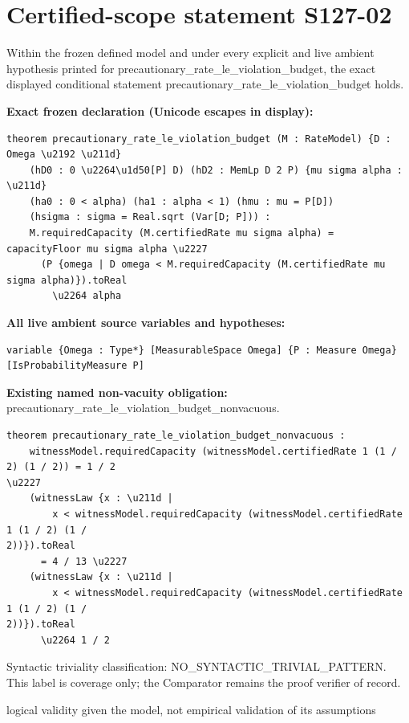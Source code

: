 \documentclass[11pt]{article}
\begin{document}
\section*{Certified-scope statement S127-02}
Within the frozen defined model and under every explicit and live ambient hypothesis printed for precautionary\_\allowbreak{}rate\_\allowbreak{}le\_\allowbreak{}violation\_\allowbreak{}budget, the exact displayed conditional statement precautionary\_\allowbreak{}rate\_\allowbreak{}le\_\allowbreak{}violation\_\allowbreak{}budget holds.
\par\noindent\textbf{Exact frozen declaration (Unicode escapes in display):}
\begin{Verbatim}[breaklines=true,breakanywhere=true,fontsize=\scriptsize]
theorem precautionary_rate_le_violation_budget (M : RateModel) {D : Omega \u2192 \u211d}
    (hD0 : 0 \u2264\u1d50[P] D) (hD2 : MemLp D 2 P) {mu sigma alpha : \u211d}
    (ha0 : 0 < alpha) (ha1 : alpha < 1) (hmu : mu = P[D])
    (hsigma : sigma = Real.sqrt (Var[D; P])) :
    M.requiredCapacity (M.certifiedRate mu sigma alpha) = capacityFloor mu sigma alpha \u2227
      (P {omega | D omega < M.requiredCapacity (M.certifiedRate mu sigma alpha)}).toReal
        \u2264 alpha
\end{Verbatim}
\noindent\textbf{All live ambient source variables and hypotheses:}
\begin{Verbatim}[breaklines=true,breakanywhere=true,fontsize=\scriptsize]
variable {Omega : Type*} [MeasurableSpace Omega] {P : Measure Omega} [IsProbabilityMeasure P]
\end{Verbatim}
\noindent\textbf{Existing named non-vacuity obligation:} precautionary\_\allowbreak{}rate\_\allowbreak{}le\_\allowbreak{}violation\_\allowbreak{}budget\_\allowbreak{}nonvacuous.
\begin{Verbatim}[breaklines=true,breakanywhere=true,fontsize=\scriptsize]
theorem precautionary_rate_le_violation_budget_nonvacuous :
    witnessModel.requiredCapacity (witnessModel.certifiedRate 1 (1 / 2) (1 / 2)) = 1 / 2
\u2227
    (witnessLaw {x : \u211d |
        x < witnessModel.requiredCapacity (witnessModel.certifiedRate 1 (1 / 2) (1 /
2))}).toReal
      = 4 / 13 \u2227
    (witnessLaw {x : \u211d |
        x < witnessModel.requiredCapacity (witnessModel.certifiedRate 1 (1 / 2) (1 /
2))}).toReal
      \u2264 1 / 2
\end{Verbatim}
\noindent Syntactic triviality classification: NO\_\allowbreak{}SYNTACTIC\_\allowbreak{}TRIVIAL\_\allowbreak{}PATTERN. This label is coverage only; the Comparator remains the proof verifier of record.
\par\noindent logical validity given the model, not empirical validation of its assumptions
\end{document}
